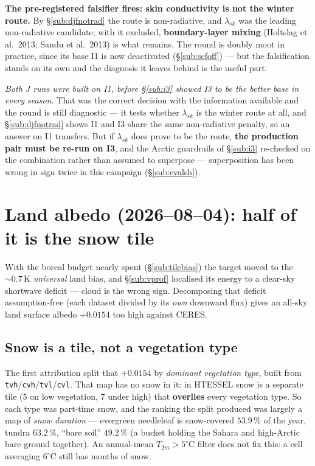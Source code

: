 \documentclass[10pt]{article}
\begin{document}
\textbf{The pre-registered falsifier fires: skin conductivity is not the winter route.} By
\S\ref{sub:djfnotrad} the route is non-radiative, and $\lambda_{sk}$ was the leading
non-radiative candidate; with it excluded, \textbf{boundary-layer mixing} (Holtslag et al.\
2013; Sandu et al.\ 2013) is what remains. The round is doubly moot in practice, since its
base I1 is now deactivated (\S\ref{sub:scfoff}) --- but the falsification stands on its own
and the diagnosis it leaves behind is the useful part.

\emph{Both J runs were built on I1, before \S\ref{sub:i3} showed I3 to be the better base in
every season.} That was the correct decision with the information available and the round is
still diagnostic --- it tests whether $\lambda_{sk}$ is the winter route at all, and
\S\ref{sub:djfnotrad} shows I1 and I3 share the same non-radiative penalty, so an answer on
I1 transfers. But if $\lambda_{sk}$ does prove to be the route, \textbf{the production pair
must be re-run on I3}, and the Arctic guardrails of \S\ref{sub:i3} re-checked on the
combination rather than assumed to superpose --- superposition has been wrong in sign twice
in this campaign (\S\ref{sub:evalsh}).

\section{Land albedo (2026--08--04): half of it is the snow tile}\label{sec:landalb}
With the boreal budget nearly spent (\S\ref{sub:tilebias}) the target moved to the
${\sim}0.7$\,K \emph{universal} land bias, and \S\ref{sub:vprof} localised its energy to a
clear-sky shortwave deficit --- cloud is the wrong sign. Decomposing that deficit
assumption-free (each dataset divided by its \emph{own} downward flux) gives an all-sky land
surface albedo $+0.0154$ too high against CERES.

\subsection{Snow is a tile, not a vegetation type}\label{sub:snowtile}
The first attribution split that $+0.0154$ by \emph{dominant vegetation type}, built from
\texttt{tvh}/\texttt{cvh}/\texttt{tvl}/\texttt{cvl}. That map has no snow in it: in HTESSEL
snow is a separate tile (5 on low vegetation, 7 under high) that \textbf{overlies} every
vegetation type. So each type was part-time snow, and the ranking the split produced was
largely a map of \emph{snow duration} --- evergreen needleleaf is snow-covered $53.9\,\%$ of
the year, tundra $63.2\,\%$, ``bare soil'' $49.2\,\%$ (a bucket holding the Sahara and
high-Arctic bare ground together). An annual-mean $T_{2m}>5^\circ$C filter does not fix this:
a cell averaging $6^\circ$C still has months of snow.
\end{document}
